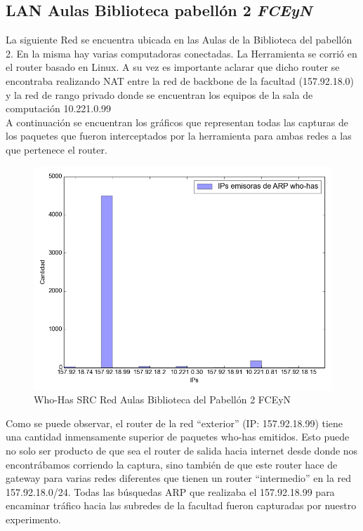 \newpage
\subsection{LAN Aulas Biblioteca pabellón 2 \textit{FCEyN}}
\indent La siguiente Red se encuentra ubicada en las Aulas de la Biblioteca del pabellón 2. En la misma hay varias computadoras conectadas. La Herramienta se corrió en el router basado en Linux. A su vez es importante aclarar que dicho router se encontraba realizando NAT entre la red de backbone de la facultad (157.92.18.0) y la red de rango privado donde se encuentran los equipos de la sala de computación 10.221.0.99 \\
\indent A continuación se encuentran los gráficos que representan todas las capturas de los paquetes que fueron interceptados por la herramienta para ambas redes a las que pertenece el router.


\begin{center}
	\begin{figure}[ht]
    	\centering
		\includegraphics[width=12cm]{imgs/outputPabloRedAulasPab2_p-arp_who_src.png}
		\caption{Who-Has SRC Red Aulas Biblioteca del Pabellón 2 FCEyN}
	\end{figure}
\end{center}

Como se puede observar, el router de la red ``exterior'' (IP: 157.92.18.99) tiene una cantidad inmensamente superior de paquetes who-has emitidos.
Esto puede no solo ser producto de que sea el router de salida hacia internet desde donde nos encontrábamos corriendo la captura, sino también de que este router hace de gateway para varias redes diferentes que tienen un router ``intermedio'' en la red 157.92.18.0/24. Todas las búsquedas ARP que realizaba el 157.92.18.99 para encaminar tráfico hacia las subredes de la facultad fueron capturadas por nuestro experimento.

